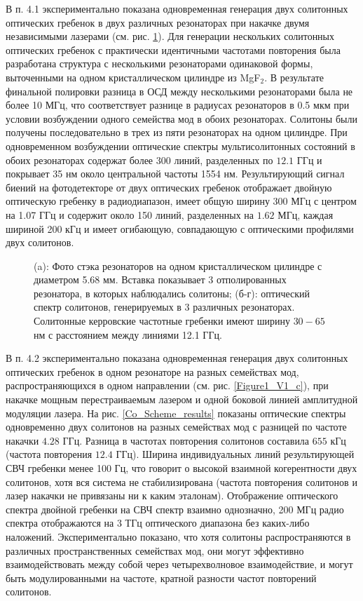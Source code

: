 В п. 4.1 экспериментально показана одновременная генерация двух солитонных оптических гребенок в двух различных резонаторах при накачке двумя независимыми лазерами (см. рис. \ref{ris:image1}). Для генерации нескольких солитонных оптических гребенок с практически идентичными частотами повторения была разработана структура с несколькими резонаторами одинаковой формы, выточенными на одном кристаллическом цилиндре из MgF$_2$. В результате финальной полировки разница в ОСД между несколькими резонаторами была не более 10 МГц, что соответствует разнице в радиусах резонаторов в 0.5 мкм при условии возбуждении одного семейства мод в обоих резонаторах. Солитоны были получены последовательно в трех из пяти резонаторах на одном цилиндре. При одновременном возбуждении оптические спектры мультисолитонных состояний в обоих резонаторах содержат более 300 линий, разделенных по $12.1$ ГГц и покрывает 35 нм около центральной частоты 1554 нм. Результирующий сигнал биений на фотодетекторе от двух оптических гребенок отображает двойную оптическую гребенку в радиодиапазон, имеет общую ширину 300 МГц с центром на 1.07 ГГц и содержит около 150 линий, разделенных на $1.62$ МГц, каждая шириной 200 кГц и имеет огибающую, совпадающую с оптическими профилями двух солитонов.

\begin{figure}[!htb]
\begin{minipage}{1\linewidth}
\end{minipage}
\setlength{\belowcaptionskip}{4pt}
\caption{(a): Фото стэка резонаторов на одном кристаллическом цилиндре с диаметром 5.68 мм. Вставка показывает 3 отполированных резонатора, в которых наблюдались солитоны; (б-г): оптический спектр солитонов, генерируемых в 3 различных резонаторах. Солитонные керровские частотные гребенки имеют ширину $30 - 65$ нм с расстоянием между линиями 12.1 ГГц.}
\label{ris:image1}
\end{figure}

В п. 4.2 экспериментально показана одновременная генерация двух солитонных оптических гребенок в одном резонаторе на разных семействах мод, распространяющихся в одном направлении (см. рис. \ref{Figure1_V1_c}), при накачке мощным перестраиваемым лазером и одной боковой линией амплитудной модуляции лазера. На рис. \ref{Co_Scheme_results} показаны оптические спектры одновременно двух солитонов на разных семействах мод с разницей по частоте накачки $4.28$ ГГц. Разница в частотах повторения солитонов составила $655$ кГц (частота повторения $12.4$ ГГц). Ширина индивидуальных линий результирующей СВЧ гребенки менее 100 Гц, что говорит о высокой взаимной когерентности двух солитонов, хотя вся система не стабилизирована (частота повторения солитонов и лазер накачки не привязаны ни к каким эталонам). Отображение оптического спектра двойной гребенки на СВЧ спектр взаимно однозначно, 200 МГц радио спектра отображаются на 3 ТГц оптического диапазона без каких-либо наложений. Экспериментально показано, что хотя солитоны распространяются в различных пространственных семействах мод, они могут эффективно взаимодействовать между собой через четырехволновое взаимодействие, и могут быть модулированными на частоте, кратной разности частот повторений солитонов.

